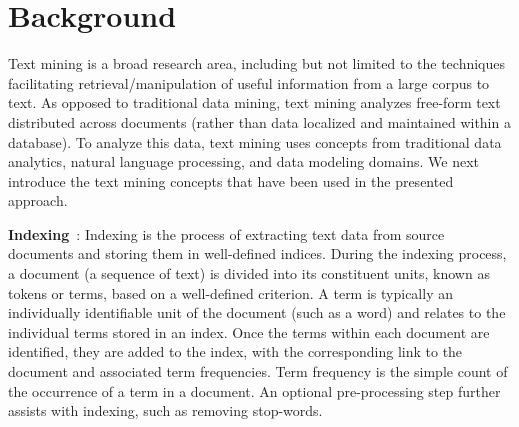 \section{Background}
\label{sec:background}


Text mining is a broad research area, 
including but not limited to the techniques 
facilitating retrieval/manipulation of useful information from a large corpus to text. 
As opposed to traditional data mining, text mining analyzes
free-form text distributed across documents
(rather than data localized and maintained within a database).
To analyze this data, text mining uses concepts from traditional
data analytics, natural language processing, and data modeling domains.
We next introduce the text mining concepts that have been used in the presented approach.


\textbf{Indexing}~\cite{frakes1992introduction,manning2008introduction}:
Indexing is the process of extracting text data from source documents
and storing them in well-defined indices.
During the indexing process, a document (a sequence of text) is divided into its constituent units, known as tokens or terms, based on a well-defined criterion. 
A term is typically an individually identifiable unit of the document (such as a word) and relates to the individual terms stored in an index. Once the terms within each document are identified, they are added to the index, with the corresponding link to the document and associated term frequencies.
Term frequency is the simple count of the occurrence of a term in a document.
An optional pre-processing step further assists with indexing, such as removing stop-words. 


